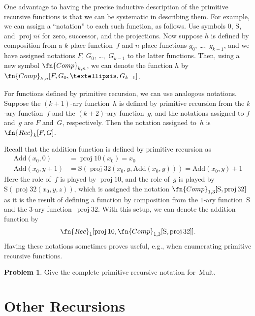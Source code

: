 \documentclass[10pt,a4paper]{article}
\theoremstyle{plain}
\theoremstyle{definition}
\newtheorem{prob}{Problem}[section]
\theoremstyle{remark}
\newcommand*{\olfileid}[3]{}
\newcommand*{\olsection}[1]{\section*{#1}}
\providecommand{\Mult}{\ensuremath{\mathrm{Mult}}}
\providecommand{\Add}{\ensuremath{\mathrm{Add}}}
\providecommand{\Zero}{\ensuremath{0}}
\providecommand{\Succ}{\ensuremath{\mathrm{S}}}
\providecommand{\Proj}{\operatorname{proj}}
\begin{document}
One advantage to having the precise inductive description of the primitive
recursive functions is that we can be systematic in describing them.
For example, we can assign a ``notation'' to each such function, as
follows. Use symbols $\Zero$, $\Succ$, and $\Proj{n}{i}$ for zero,
successor, and the projections. Now suppose $h$ is defined by
composition from a $k$-place function~$f$ and $n$-place functions $g_0$,
\dots,~$g_{k-1}$, and we have assigned notations $F$, $G_0$,
\dots,~$G_{k-1}$ to the latter functions. Then, using a new symbol
$\fn{Comp}_{k,n}$, we can denote the function $h$ by
$\fn{Comp}_{k,n}[F,G_0,\dots,G_{k-1}]$. 

For functions defined by primitive recursion, we can use analogous
notations. Suppose the $(k+1)$-ary function~$h$ is defined by
primitive recursion from the $k$-ary function~$f$ and the $(k+2)$-ary
function~$g$, and the notations assigned to $f$ and~$g$ are $F$
and~$G$, respectively. Then the notation assigned to~$h$ is
$\fn{Rec}_k[F,G]$. 

Recall that the addition function is defined by primitive recursion as
\begin{align*}
  \Add(x_0, 0) & = \Proj{1}{0}(x_0) = x_0\\
  \Add(x_0, y+1) & = \Succ(\Proj{3}{2}(x_0, y, \Add(x_0, y))) = \Add(x_0, y) +1
\end{align*}
Here the role of~$f$ is played by $\Proj{1}{0}$, and the role of~$g$
is played by $\Succ(\Proj{3}{2}(x_0, y, z))$, which is assigned the
notation $\fn{Comp}_{1,3}[\Succ,\Proj{3}{2}]$ as it is the result of
defining a function by composition from the $1$-ary function~$\Succ$
and the $3$-ary function~$\Proj{3}{2}$. With this setup, we can denote
the addition function by
\[
\fn{Rec}_1[\Proj{1}{0},\fn{Comp}_{1,3}[\Succ,\Proj{3}{2}]].
\]
Having these notations sometimes proves useful, e.g., when enumerating
primitive recursive functions.

\begin{prob}
  Give the complete primitive recursive notation for~$\Mult$.
\end{prob}





\olfileid{cmp}{rec}{ore}
\olsection{Other Recursions}
\end{document}
